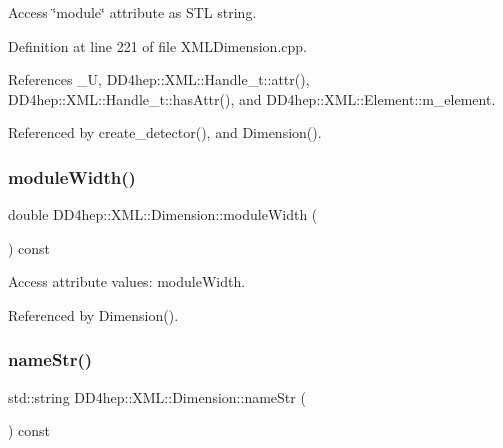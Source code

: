 Access \char`\"{}module\char`\"{} attribute as S\+TL string. 



Definition at line 221 of file X\+M\+L\+Dimension.\+cpp.



References \+\_\+U, D\+D4hep\+::\+X\+M\+L\+::\+Handle\+\_\+t\+::attr(), D\+D4hep\+::\+X\+M\+L\+::\+Handle\+\_\+t\+::has\+Attr(), and D\+D4hep\+::\+X\+M\+L\+::\+Element\+::m\+\_\+element.



Referenced by create\+\_\+detector(), and Dimension().

\hypertarget{struct_d_d4hep_1_1_x_m_l_1_1_dimension_a84490ea1bc8bd6f25022ee9838421b64}{}\label{struct_d_d4hep_1_1_x_m_l_1_1_dimension_a84490ea1bc8bd6f25022ee9838421b64} 
\subsubsection{\texorpdfstring{module\+Width()}{moduleWidth()}}
{\footnotesize\ttfamily double D\+D4hep\+::\+X\+M\+L\+::\+Dimension\+::module\+Width (\begin{DoxyParamCaption}{ }\end{DoxyParamCaption}) const}



Access attribute values\+: module\+Width. 



Referenced by Dimension().

\hypertarget{struct_d_d4hep_1_1_x_m_l_1_1_dimension_a58e9198fb6bdb6099a8035ea2343f395}{}\label{struct_d_d4hep_1_1_x_m_l_1_1_dimension_a58e9198fb6bdb6099a8035ea2343f395} 
\subsubsection{\texorpdfstring{name\+Str()}{nameStr()}}
{\footnotesize\ttfamily std\+::string D\+D4hep\+::\+X\+M\+L\+::\+Dimension\+::name\+Str (\begin{DoxyParamCaption}{ }\end{DoxyParamCaption}) const}



